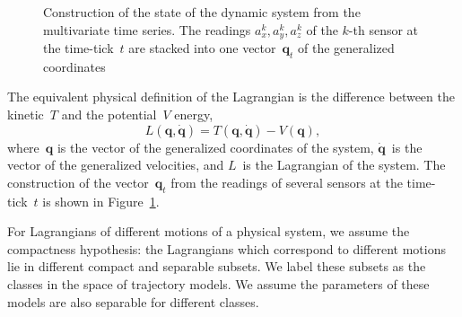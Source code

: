 \documentclass[sn-mathphys-num]{sn-jnl}
\theoremstyle{thmstylethree}
\theoremstyle{thmstyletwo}
\theoremstyle{thmstyleone}
\begin{document}
\begin{figure}
\centering
{}
\caption{Construction of the state of the dynamic system from the multivariate time series. The readings $a^k_x, a^k_y, a^k_z$ of the $k$-th sensor at the time-tick~$t$ are stacked into one vector~$\mathbf{q}_t$ of the generalized coordinates}
\label{fig:trajectory_construction}
\end{figure}
The equivalent physical definition of the Lagrangian is the difference between the kinetic~$T$ and the potential~$V$ energy,
\begin{equation}
L\left(\mathbf{q},\dot{\mathbf{q}}\right) = T\left(\mathbf{q},\dot{\mathbf{q}}\right)- V\left(\mathbf{q}\right),
\label{eq:L=T-V}
\end{equation}
where~$\mathbf{q}$ is the vector of the generalized coordinates of the system, $\dot{\mathbf{q}}$~is the vector of the generalized velocities, and $L$~is the Lagrangian of the system. The construction of the vector~$\mathbf{q}_t$ from the readings of several sensors at the time-tick~$t$ is shown in Figure~\ref{fig:trajectory_construction}.

For Lagrangians of different motions of a physical system, we assume the compactness hypothesis: the Lagrangians which correspond to different motions lie in different compact and separable subsets. We label these subsets as the classes in the space of trajectory models. We assume the parameters of these models are also separable for different classes.
\end{document}
